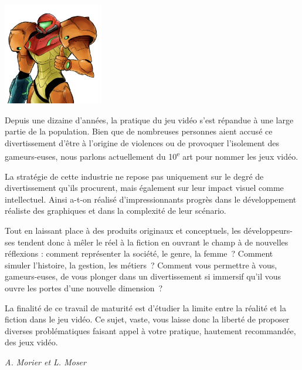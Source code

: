 \documentclass[
  10pt,
  french,
  a5paper,
  openany]{book}
\newenvironment{signature}{\begin{flushright}}{\end{flushright}}
\begin{document}

\begin{center}
\includegraphics[width=\textwidth,height=12em]{images/le-jeu-video-fiction-ou-realite.jpg}

\end{center}


Depuis une dizaine d'années, la pratique du jeu vidéo s'est répandue à une large partie de la population. Bien que de nombreuses personnes aient accusé ce divertissement d'être à l'origine de violences ou de provoquer l'isolement des gameurs-euses, nous parlons actuellement du 10\textsuperscript{e} art pour nommer les jeux vidéo.

La stratégie de cette industrie ne repose pas uniquement sur le degré de divertissement qu'ils procurent, mais également sur leur impact visuel comme intellectuel. Ainsi a-t-on réalisé d'impressionnants progrès dans le développement réaliste des graphiques et dans la complexité de leur scénario.

Tout en laissant place à des produits originaux et conceptuels, les développeurs-ses tendent donc à mêler le réel à la fiction en ouvrant le champ à de nouvelles réflexions : comment représenter la société, le genre, la femme~? Comment simuler l'histoire, la gestion, les métiers~? Comment vous permettre à vous, gameurs-euses, de vous plonger dans un divertissement si immersif qu'il vous ouvre les portes d'une nouvelle dimension~?

\clearpage

La finalité de ce travail de maturité est d'étudier la limite entre la réalité et la fiction dans le jeu vidéo. Ce sujet, vaste, vous laisse donc la liberté de proposer diverses problématiques faisant appel à votre pratique, hautement recommandée, des jeux vidéo.

\begin{signature}
\emph{A. Morier et L. Moser}

\end{signature}
\end{document}
